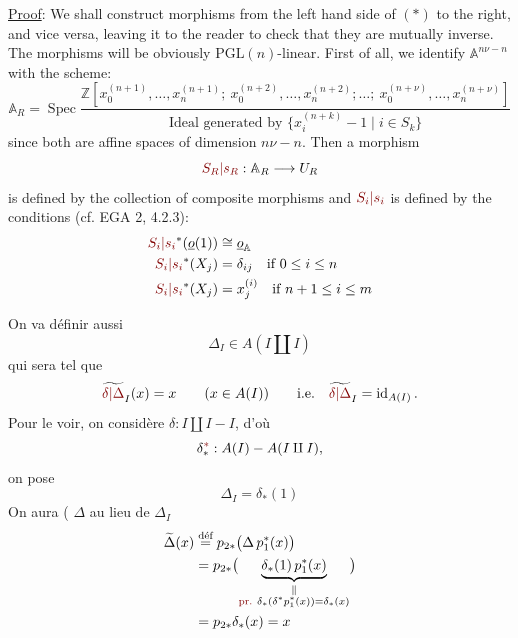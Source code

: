 \uline{Proof}: We shall construct morphisms from the left hand side of $(*)$ to the right, and vice versa, leaving it to the reader to check that they are mutually inverse. The morphisms will be obviously $\mathrm{PGL}(n)$-linear. First of all, we identify $\mathbb{A}^{n\nu-n}$ with the scheme:
\[
\mathbb{A}_R=\operatorname{Spec}
\frac{\mathbb{Z}[x_0^{(n+1)},\ldots,x_n^{(n+1)};\ x_0^{(n+2)},\ldots,x_n^{(n+2)};\ldots;\ x_0^{(n+\nu)},\ldots,x_n^{(n+\nu)}]}
{\text{Ideal generated by }\{x_i^{(n+k)}-1\mid i\in S_k\}}
\]
since both are affine spaces of dimension $n\nu-n$. Then a morphism
\[
\unsure{S_R|s_R}:\mathbb{A}_R\longrightarrow U_R
\]
is defined by the collection of composite morphisms
and $\unsure{S_i|s_i}$ is defined by the conditions (cf. EGA 2, 4.2.3):
\[
\begin{aligned}
\unsure{S_i|s_i}^*(\underline{o}(1))&\cong\underline{o}_{\mathbb{A}}\\
\unsure{S_i|s_i}^*(X_j)&=\delta_{ij}\quad\text{if }0\leq i\leq n\\
\unsure{S_i|s_i}^*(X_j)&=x_j^{(i)}\quad\text{if }n+1\leq i\leq m
\end{aligned}
\]


On va définir aussi
\[
\Delta_I\in A(I\amalg I)
\]
qui sera tel que
\[
\widetilde{\unsure{\delta|\Delta}}_I(x)=x\qquad(x\in A(I))
\qquad\text{i.e.}\quad\widetilde{\unsure{\delta|\Delta}}_I=\operatorname{id}_{A(I)}.
\]
Pour le voir, on  considère $\delta:I\amalg I-I$, d'où
\[
\delta^{\deleted{\unsure{*}}}_*:A(I)-A(I\amalg I),
\]
on pose
\[
\Delta_I=\delta_*(1)
\]
On aura ( $\Delta$ au lieu de $\Delta_I$
\[
\begin{aligned}
\widetilde\Delta(x)&\overset{\text{déf}}{=}p_{2*}\bigl(\Delta\,p_1^*(x)\bigr)\\
&=p_{2*}\bigl(\underbrace{\delta_*(1)\,p_1^*(x)}
_{\substack{\Vert\\ \unsure{\text{pr.}}\ \delta_*(\delta^*p_1^*(x))=\delta_*(x)}}\bigr)\\
&=p_{2*}\delta_*(x)=x
\end{aligned}
\]

